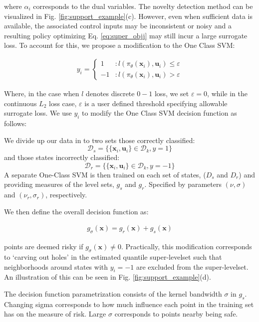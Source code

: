 \documentclass[10pt, conference]{ieeeconf}      %
\newcommand{\bu}{\mathbf{u}}
\newcommand{\bx}{\mathbf{x}}
\begin{document}
where $\alpha_i$ corresponds to the dual variables.  The novelty detection method can be visualized in Fig. \ref{fig:support_example}(c). 
However, even when sufficient data is available, the associated control inputs may be inconsistent or noisy and a resulting policy
optimizing Eq. \ref{eq:super_objj} may still incur a large surrogate loss. To account for this, we propose a
modification to the One Class SVM:

\begin{align}
y_i = \left\{
     \begin{array}{lr}
         1 & : l(\pi_{\theta}(\bx_i),\bu_i)\le \varepsilon\\
         -1 & : l(\pi_{\theta}(\bx_i),\bu_i)>\varepsilon
     \end{array}
   \right.
\end{align}

Where, in the case when $l$ denotes discrete $0-1$ loss, we set $\varepsilon = 0$, while in the continuous $L_2$ loss
case, $\varepsilon$ is a user defined threshold specifying allowable surrogate loss.
We use $y_i$ to modify the One Class SVM decision function as follows: 


We divide up our data in to two sets those correctly classified:
$$\mathcal{D}_{s}=\{\lbrace \bx_i,\bu_i \rbrace \in \mathcal{D}_{k}, y=1\}$$
and those states incorrectly classified: 
$$\mathcal{D}_{r}=\{\lbrace \bx_i,\bu_i \rbrace \in \mathcal{D}_{k}, y=-1\}$$
A separate One-Class SVM is then trained on each set of states, ($D_{s}$ and $D_{r}$) and providing measures of the level sets, $g_{s}$ and $g_{r}$. Specified by parameters $(\nu,\sigma)$ and $(\nu_r,\sigma_r)$, respectively. 

We then define the overall decision function as:

\vspace{-2ex}
\begin{align}\label{eq:decision_func}
g_{\sigma}(\bx) = g_{r} (\bx)+ g_{s}(\bx)
\end{align}

points are deemed risky if $g_{\sigma}(\bx) \neq 0$.  Practically, this modification corresponds to
`carving out holes' in the estimated quantile super-levelset such that neighborhoods around states with $y_i=-1$ are
excluded from the super-levelset. An illustration of this can be seen in Fig. \ref{fig:support_example}(d).

The decision function parametrization consists of the kernel bandwidth $\sigma$ in $g_s$. Changing sigma corresponds to how much influence each point in the training set has on the measure of risk. Large $\sigma$ corresponds to points nearby being safe.
\end{document}
